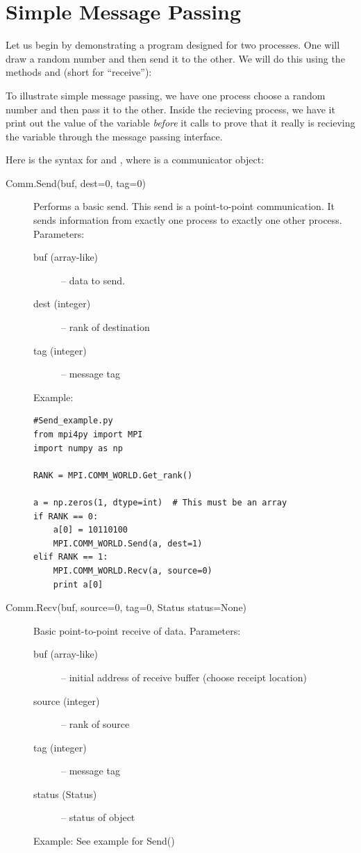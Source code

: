 \section*{Simple Message Passing} Let us begin by demonstrating a program
designed for two processes. One will draw a random number and then send it to
the other. We will do this using the methods  and 
(short for ``receive''):



To illustrate simple message passing, we have one process choose a random number
and then pass it to the other. Inside the recieving process, we have it print
out the value of the variable  \emph{before} it calls 
to prove that it really is recieving the variable through the message passing
interface.

Here is the syntax for  and , where  is a
communicator object:

\begin{description}
\item[Comm.Send(buf, dest=0, tag=0)]
Performs a basic send. This send is a point-to-point communication. It sends information from exactly one process to exactly one other process.
Parameters:
\begin{description}
\item[buf (array-like)] – data to send.


\item[dest (integer)] – rank of destination
\item[tag (integer)] – message tag
\end{description}
Example:
\begin{lstlisting}
#Send_example.py
from mpi4py import MPI
import numpy as np

RANK = MPI.COMM_WORLD.Get_rank()

a = np.zeros(1, dtype=int)  # This must be an array
if RANK == 0:
    a[0] = 10110100
    MPI.COMM_WORLD.Send(a, dest=1)
elif RANK == 1:
    MPI.COMM_WORLD.Recv(a, source=0)
    print a[0]
\end{lstlisting}
\item[Comm.Recv(buf, source=0, tag=0, Status status=None)]
Basic point-to-point receive of data.
Parameters:
\begin{description}
\item[buf (array-like)] – initial address of receive buffer (choose receipt location)
\item[source (integer)] – rank of source
\item[tag (integer)] – message tag
\item[status (Status)] – status of object
\end{description}
Example:
See example for Send()
\end{description}

